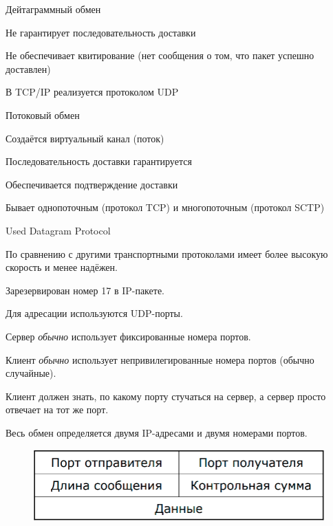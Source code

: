 
\begin{MyItemize}
    \item Дейтаграммный обмен
    \begin{MyItemize}
        \item Не гарантирует последовательность доставки
        \item Не обеспечивает квитирование (нет сообщения о том, что пакет успешно доставлен)
        \item В TCP/IP реализуется протоколом UDP
    \end{MyItemize}
    \item Потоковый обмен
    \begin{MyItemize}
        \item Создаётся виртуальный канал (поток)
        \item Последовательность доставки гарантируется
        \item Обеспечивается подтверждение доставки
        \item Бывает однопоточным (протокол TCP) и многопоточным (протокол SCTP)
    \end{MyItemize}
\end{MyItemize}


Used Datagram Protocol

По сравнению с другими транспортными протоколами имеет более высокую скорость и менее надёжен.

Зарезервирован номер 17 в IP-пакете. 

Для адресации используются UDP-порты.

Сервер {\it обычно} использует фиксированные номера портов.

Клиент {\it обычно} использует непривилегированные номера портов (обычно случайные).

Клиент должен знать, по какому порту стучаться на сервер, а сервер просто отвечает на тот же порт.

Весь обмен определяется двумя IP-адресами и двумя номерами портов.


\begin{figure}[H]
  \centering
  \includegraphics[width=15cm]{images/03/01}
\end{figure}

